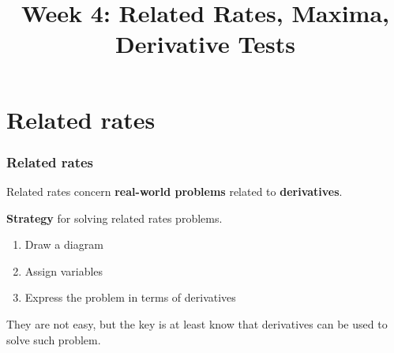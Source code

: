 \documentclass[t]{beamer}
\title{Week 4:  Related Rates,  Maxima,  Derivative Tests}
\theoremstyle{plain}
\theoremstyle{definition}
\begin{document}
\frame{\titlepage}

\setcounter{tocdepth}{2}
\frame{\tableofcontents
}


\section{Related rates}

\begin{frame}
\frametitle{Related rates}

Related rates concern \textbf{real-world problems} related to \textbf{derivatives}.

\vspace{1em}

\textbf{Strategy} for solving related rates problems.
\begin{enumerate}
\item Draw a diagram
\item Assign variables
\item Express the problem in terms of derivatives
\end{enumerate}

\vspace{1em}

They are not easy, but the key is at least know that derivatives can be used to solve such problem.

\end{frame}
\end{document}
